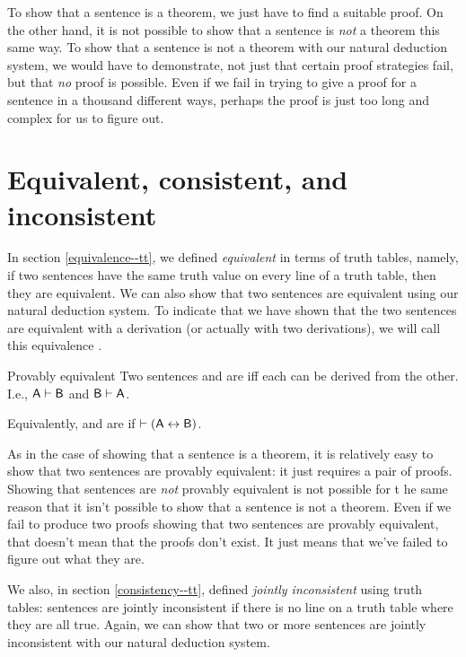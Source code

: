 To show that a sentence is a theorem, we just have to find a suitable proof. On the other hand, it is not possible to show that a sentence is \emph{not} a theorem this same way. To show that a sentence is not a theorem with our natural deduction system, we would have to demonstrate, not just that certain proof strategies fail, but that \emph{no} proof is possible. Even if we fail in trying to give a proof for a sentence in a thousand different ways, perhaps the proof is just too long and complex for us to figure out. 


\section{Equivalent, consistent, and inconsistent}

In section \ref{equivalence--tt}, we defined \textit{equivalent} in terms of truth tables, namely, if two sentences have the same truth value on every line of a truth table, then they are equivalent. We can also show that two sentences are equivalent using our natural deduction system. To indicate that we have shown that the two sentences are equivalent with a derivation (or actually with two derivations), we will call this equivalence . 

\begin{factboxy}{Provably equivalent}
Two sentences  and  are  iff each can be derived from the other. I.e., $\mathsf{A}\vdash\mathsf{B}$ and $\mathsf{B}\vdash\mathsf{A}$.\medskip

Equivalently,  and  are  if $\vdash (\mathsf{A} \leftrightarrow \mathsf{B})$.
\end{factboxy}
        
As in the case of showing that a sentence is a theorem, it is relatively easy to show that two sentences are provably equivalent: it just requires a pair of proofs. Showing that sentences are \emph{not} provably equivalent is not possible for t he same reason that it isn't possible to show that a sentence is not a theorem. Even if we fail to produce two proofs showing that two sentences are provably equivalent, that doesn't mean that the proofs don't exist. It just means that we've failed to figure out what they are. 

We also, in section \ref{consistency--tt}, defined \textit{jointly inconsistent} using truth tables: sentences are jointly inconsistent if there is no line on a truth table where they are all true. Again, we can show that two or more sentences are jointly inconsistent with our natural deduction system. 

